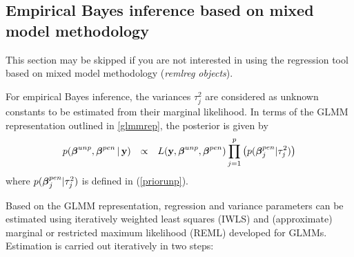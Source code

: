 \documentclass[11pt,a4paper,twoside]{bayesxarticle}
\begin{document}

\subsection{Empirical Bayes inference based on mixed model methodology}
\label{glmmmeth}

This section may be skipped if you are not interested in using the
regression tool based on mixed model methodology ({\em remlreg
objects}).

For empirical Bayes inference, the variances $\tau^2_j$ are
considered as unknown constants to be estimated from their marginal
likelihood. In terms of the GLMM representation outlined in
\autoref{glmmrep}, the posterior is given by
\begin{equation}
\label{posterior2}
\begin{array}{lll}
 p(\betavec^{unp},\betavec^{pen}\, | \, \yvec) & \propto & L( \yvec,\betavec^{unp},\betavec^{pen})
\displaystyle \prod_{j=1}^p \left( p(\betavec_j^{pen}|\tau_j^2)  \right) \\
 \end{array}
\end{equation}
where $p(\boldsymbol{\beta}_j^{pen}|\tau_j^2)$ is defined in (\ref{priorunp}).

Based on the GLMM representation, regression and variance parameters
can be estimated using iteratively weighted least squares (IWLS) and
(approximate) marginal or restricted maximum likelihood (REML)
developed for GLMMs. Estimation is carried out iteratively in two
steps:
\end{document}
